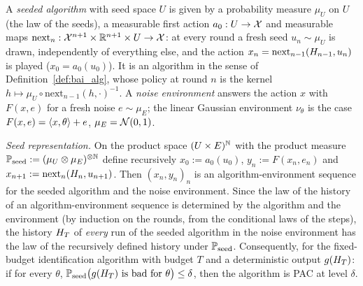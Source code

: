 \begin{lemma}\label{lem:seeded}
\leanok
{}
A \emph{seeded algorithm} with seed space $U$ is given by a probability measure $\mu_U$ on
$U$ (the law of the seeds), a measurable first action $a_0 : U \to \mathcal{X}$ and measurable
maps $\mathrm{next}_n : \mathcal{X}^{n+1} \times \mathbb{R}^{n+1} \times U \to \mathcal{X}$: at every round a fresh seed
$u_n \sim \mu_U$ is drawn, independently of everything else, and the action
$x_n = \mathrm{next}_{n-1}(H_{n-1}, u_n)$ is played ($x_0 = a_0(u_0)$). It is an
algorithm in the sense of Definition~\ref{def:bai_alg}, whose policy at round $n$ is the
kernel $h \mapsto \mu_U \circ \mathrm{next}_{n-1}(h, \cdot)^{-1}$. A \emph{noise environment}
answers the action $x$ with $F(x, e)$ for a fresh noise $e \sim \mu_E$; the linear Gaussian
environment $\nu_\theta$ is the case $F(x, e) = \langle x, \theta \rangle + e$, $\mu_E = \mathcal{N}(0,1)$.

\emph{Seed representation.} On the product space $(U \times E)^{\mathbb{N}}$ with the product
measure $\mathbb{P}_{\mathrm{seed}} := (\mu_U \otimes \mu_E)^{\otimes\mathbb{N}}$ define recursively
$x_0 := a_0(u_0)$, $y_n := F(x_n, e_n)$ and $x_{n+1} := \mathrm{next}_n(H_n, u_{n+1})$.
Then $(x_n, y_n)_n$ is an algorithm-environment sequence for the seeded algorithm and the
noise environment. Since the law of the history of an algorithm-environment sequence is
determined by the algorithm and the environment (by induction on the rounds, from the
conditional laws of the steps), the history $H_T$ of \emph{every} run of the seeded
algorithm in the noise environment has the law of the recursively defined history under
$\mathbb{P}_{\mathrm{seed}}$. Consequently, for the fixed-budget identification algorithm with
budget $T$ and a deterministic output $g(H_T)$: if for every $\theta$,
$\mathbb{P}_{\mathrm{seed}}\big(g(H_T) \text{ is bad for } \theta\big) \le \delta$, then
the algorithm is PAC at level $\delta$.
\end{lemma}

